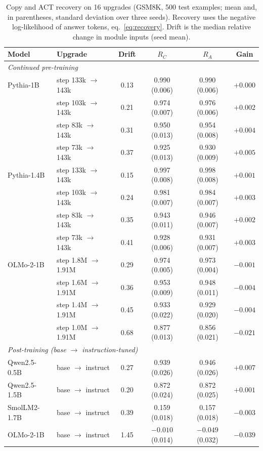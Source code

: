 \documentclass[ijds,nonblindrev]{informs4}
\begin{document}
\begin{table}[t]
\centering
\caption{Copy and ACT recovery on 16 upgrades (GSM8K, 500 test examples; mean and, in parentheses, standard deviation over three seeds). Recovery uses the negative log-likelihood of answer tokens, eq.~\eqref{eq:recovery}. Drift is the median relative change in module inputs (seed mean).}\label{tab:pairs}
\small
\begin{tabular}{llcccc}
\toprule
Model & Upgrade & Drift & $R_C$ & $R_A$ & Gain\\
\midrule
\multicolumn{6}{l}{\emph{Continued pre-training}}\\
Pythia-1B & step 133k $\to$ 143k & 0.13 & 0.990 (0.006) & 0.990 (0.006) & $+0.000$\\
 & step 103k $\to$ 143k & 0.21 & 0.974 (0.007) & 0.976 (0.006) & $+0.002$\\
 & step 83k $\to$ 143k & 0.31 & 0.950 (0.013) & 0.954 (0.008) & $+0.004$\\
 & step 73k $\to$ 143k & 0.37 & 0.925 (0.013) & 0.930 (0.009) & $+0.005$\\
Pythia-1.4B & step 133k $\to$ 143k & 0.15 & 0.997 (0.008) & 0.998 (0.008) & $+0.001$\\
 & step 103k $\to$ 143k & 0.24 & 0.981 (0.007) & 0.984 (0.007) & $+0.003$\\
 & step 83k $\to$ 143k & 0.35 & 0.943 (0.011) & 0.946 (0.007) & $+0.002$\\
 & step 73k $\to$ 143k & 0.41 & 0.928 (0.006) & 0.931 (0.007) & $+0.003$\\
OLMo-2-1B & step 1.8M $\to$ 1.91M & 0.29 & 0.974 (0.005) & 0.973 (0.004) & $-0.001$\\
 & step 1.6M $\to$ 1.91M & 0.36 & 0.953 (0.009) & 0.948 (0.011) & $-0.004$\\
 & step 1.4M $\to$ 1.91M & 0.45 & 0.933 (0.022) & 0.929 (0.020) & $-0.004$\\
 & step 1.0M $\to$ 1.91M & 0.68 & 0.877 (0.013) & 0.856 (0.021) & $-0.021$\\
\multicolumn{6}{l}{\emph{Post-training (base $\to$ instruction-tuned)}}\\
Qwen2.5-0.5B & base $\to$ instruct & 0.27 & 0.939 (0.026) & 0.946 (0.026) & $+0.007$\\
Qwen2.5-1.5B & base $\to$ instruct & 0.20 & 0.872 (0.024) & 0.872 (0.025) & $+0.001$\\
SmolLM2-1.7B & base $\to$ instruct & 0.39 & 0.159 (0.018) & 0.157 (0.018) & $-0.003$\\
OLMo-2-1B & base $\to$ instruct & 1.45 & $-0.010$ (0.014) & $-0.049$ (0.032) & $-0.039$\\
\bottomrule
\end{tabular}
\end{table}
\end{document}
